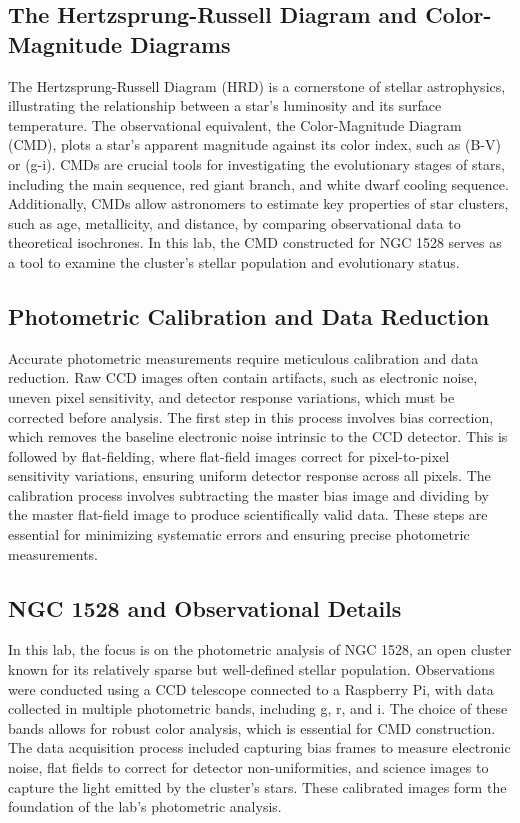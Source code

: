 \documentclass[linenumbers,twocolumn]{aastex631}
\begin{document}
\subsection{The Hertzsprung-Russell Diagram and Color-Magnitude Diagrams}

The Hertzsprung-Russell Diagram (HRD) is a cornerstone of stellar astrophysics, illustrating the relationship between a star's luminosity and its surface temperature. The observational equivalent, the Color-Magnitude Diagram (CMD), plots a star's apparent magnitude against its color index, such as (B-V) or (g-i). CMDs are crucial tools for investigating the evolutionary stages of stars, including the main sequence, red giant branch, and white dwarf cooling sequence. Additionally, CMDs allow astronomers to estimate key properties of star clusters, such as age, metallicity, and distance, by comparing observational data to theoretical isochrones. In this lab, the CMD constructed for NGC 1528 serves as a tool to examine the cluster's stellar population and evolutionary status.

\subsection{Photometric Calibration and Data Reduction}

Accurate photometric measurements require meticulous calibration and data reduction. Raw CCD images often contain artifacts, such as electronic noise, uneven pixel sensitivity, and detector response variations, which must be corrected before analysis. The first step in this process involves bias correction, which removes the baseline electronic noise intrinsic to the CCD detector. This is followed by flat-fielding, where flat-field images correct for pixel-to-pixel sensitivity variations, ensuring uniform detector response across all pixels. The calibration process involves subtracting the master bias image and dividing by the master flat-field image to produce scientifically valid data. These steps are essential for minimizing systematic errors and ensuring precise photometric measurements.

\subsection{NGC 1528 and Observational Details}

In this lab, the focus is on the photometric analysis of NGC 1528, an open cluster known for its relatively sparse but well-defined stellar population. Observations were conducted using a CCD telescope connected to a Raspberry Pi, with data collected in multiple photometric bands, including g, r, and i. The choice of these bands allows for robust color analysis, which is essential for CMD construction. The data acquisition process included capturing bias frames to measure electronic noise, flat fields to correct for detector non-uniformities, and science images to capture the light emitted by the cluster's stars. These calibrated images form the foundation of the lab's photometric analysis.
\end{document}
